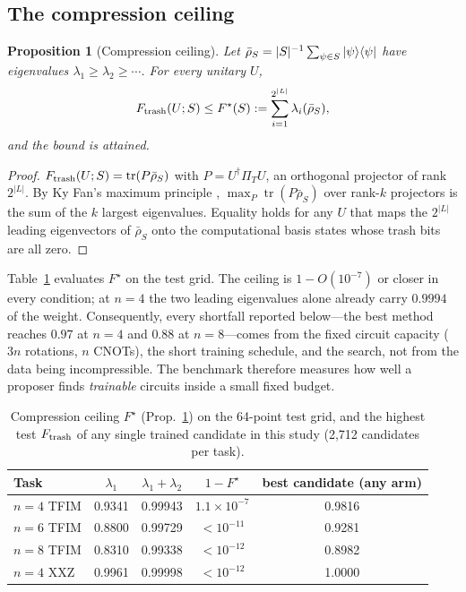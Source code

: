 \documentclass[11pt]{article}
\newtheorem{proposition}{Proposition}
\begin{document}
\subsection{The compression ceiling}

\begin{proposition}[Compression ceiling]
\label{prop:ceiling}
Let $\bar\rho_S=|S|^{-1}\sum_{\psi\in S}\ket\psi\!\bra\psi$ have eigenvalues
$\lambda_1\ge\lambda_2\ge\cdots$. For every unitary $U$,
\begin{equation}
F_{\rm trash}(U;S)\le F^\star(S) := \sum_{i=1}^{2^{|L|}}\lambda_i(\bar\rho_S),
\end{equation}
and the bound is attained.
\end{proposition}
\begin{proof}
$F_{\rm trash}(U;S)=\operatorname{tr}(P\bar\rho_S)$ with $P=U^\dagger\Pi_TU$, an
orthogonal projector of rank $2^{|L|}$. By Ky Fan's maximum principle
\cite{fan1949theorem}, $\max_P \operatorname{tr}(P\bar\rho_S)$ over rank-$k$ projectors is
the sum of the $k$ largest eigenvalues. Equality holds for any $U$ that maps the
$2^{|L|}$ leading eigenvectors of $\bar\rho_S$ onto the computational basis states
whose trash bits are all zero.
\end{proof}

Table~\ref{tab:ceiling} evaluates $F^\star$ on the test grid.
The ceiling is $1-O(10^{-7})$ or closer in every condition; at $n=4$ the two leading
eigenvalues alone already carry $0.9994$ of the weight.
Consequently, every shortfall reported below---the best method reaches
$0.97$ at $n=4$ and $0.88$ at $n=8$---comes from the fixed circuit capacity
($3n$ rotations, $n$ CNOTs), the short training schedule, and the search, not from
the data being incompressible.
The benchmark therefore measures how well a proposer finds \emph{trainable}
circuits inside a small fixed budget.

\begin{table}[t]
\centering\small
\caption{Compression ceiling $F^\star$ (Prop.~\ref{prop:ceiling}) on the 64-point test
grid, and the highest test $F_{\rm trash}$ of any single trained candidate in this study (2{,}712 candidates per task).}
\label{tab:ceiling}
\begin{tabular}{lcccc}
\toprule
Task & $\lambda_1$ & $\lambda_1+\lambda_2$ & $1-F^\star$ & best candidate (any arm)\\
\midrule
$n{=}4$ TFIM & 0.9341 & 0.99943 & $1.1\times10^{-7}$ & 0.9816\\
$n{=}6$ TFIM & 0.8800 & 0.99729 & $<10^{-11}$ & 0.9281\\
$n{=}8$ TFIM & 0.8310 & 0.99338 & $<10^{-12}$ & 0.8982\\
$n{=}4$ XXZ & 0.9961 & 0.99998 & $<10^{-12}$ & 1.0000\\
\bottomrule
\end{tabular}
\end{table}
\end{document}
